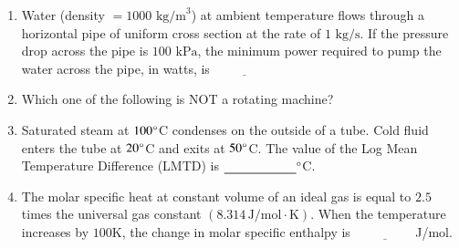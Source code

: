 \documentclass[journal]{IEEEtran}
\begin{document}
\begin{enumerate}[leftmargin=0pt]
    \hfill{}

    \begin{enumerate}
    \end{enumerate}

    \item Water (density $= 1000\text{ kg/m}^3$) at ambient temperature flows through a horizontal pipe of uniform cross section at the rate of $1\text{ kg/s}$. If the pressure drop across the pipe is $100\text{ kPa}$, the minimum power required to pump the water across the pipe, in watts, is
    $\underline{\hspace{2cm}}$

    \hfill{}

    \item Which one of the following is NOT a rotating machine?

    \hfill{}

    \begin{enumerate}
    \end{enumerate}

    \item Saturated steam at $100\degree$C condenses on the outside of a tube. Cold fluid enters the tube at $20\degree$C and exits at $50\degree$C. The value of the Log Mean Temperature Difference (LMTD) is
        $\underline{\hspace{2cm}} \degree$C.

    \hfill{}

    \item The molar specific heat at constant volume of an ideal gas is equal to $2.5$ times the universal gas constant $(8.314\,\text{J}/\text{mol}\cdot\text{K})$. When the temperature increases by $100$K, the change in molar specific enthalpy is 
        $\underline{\hspace{2cm}}$J/mol.


\end{enumerate}
\end{document}
